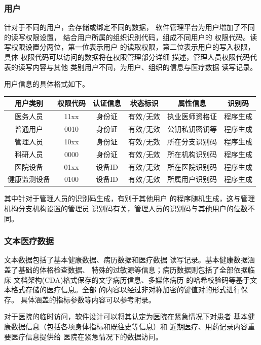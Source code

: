 \documentclass[UTF8]{ctexart}
\begin{document}
    \subsubsection{用户}
    \par
    针对于不同的用户，会存储或绑定不同的数据，
    软件管理平台为用户增加了不同的读写权限设置，
    结合用户所属的组织识别代码，组成不同用户的
    权限代码。读写权限设置分两位，第一位表示用户
    的读取权限，第二位表示用户的写入权限，具体
    权限代码可以访问的数据将在权限管理部分详细
    描述，管理人员权限代码代表的读写内容与其他
    类别用户不同，为用户、组织的信息与医疗数据
    读写记录。
    \par
    用户信息的具体格式如下。
    \begin{center}
    \begin{tabular}{cccccc}
        \hline
        用户类别& 权限代码& 认证信息& 状态标识& 属性信息& 识别码\\
        \hline
        医务人员& 11xx& 身份证& 有效/无效& 执业医师资格证& 程序生成\\
        普通用户& 0010& 身份证& 有效/无效& 公钥私钥密钥等& 程序生成\\
        管理人员& 10xx& 身份证& 有效/无效& 所在分支识别码& 程序生成\\
        科研人员& 0000& 身份证& 有效/无效& 所在机构识别码& 程序生成\\
        医院设备& 01xx& 设备ID& 有效/无效& 所在医院识别码& 程序生成\\
        健康监测设备& 0100& 设备ID& 有效/无效& 所属用户识别码& 程序生成\\
        \hline
    \end{tabular}
    \end{center}
    其中针对于管理人员的识别码生成，有别于其他用户
    的程序随机生成，这与管理机构分支机构设置的管理员
    识别码有关，管理人员的识别码与其他用户的位数不同。
    \par
    \subsubsection{文本医疗数据}
    \par
    文本数据包括了基本健康数据、病历数据和医疗数据
    读写记录。基本健康数据涵盖了基础的体格检查数据、
    特殊的过敏源等信息；病历数据则包括了全部依据临床
    文档架构(CDA)格式保存的文字病历信息、多媒体病历
    的哈希校验码等基于文本格式存储的医疗信息。全部
    的内容以经过非对称加密的键值对的形式进行保存。
    具体涵盖的指标参数等内容可以参考附录。
    \par
    对于医院的临时访问，软件设计可以将其认定为医院在紧急情况下对患者
    基本健康数据信息（包括各项身体指标和既往史等信息）和
    近期医疗、用药记录内容重要医疗信息提供给
    医院在紧急情况下的数据访问。
\end{document}
